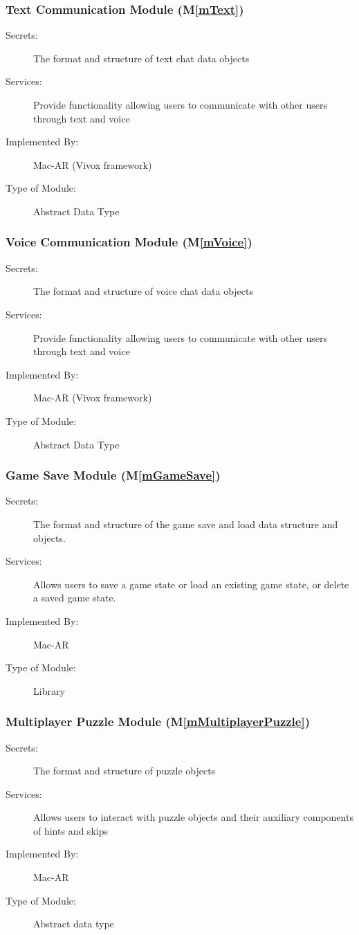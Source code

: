 \documentclass[12pt, titlepage]{article}
\newcommand{\mref}[1]{M\ref{#1}}
\begin{document}
\subsubsection{Text Communication Module (\mref{mText})}
\begin{description}
\item[Secrets:]The format and structure of text chat data objects
\item[Services:]Provide functionality allowing users to communicate with other users through text and voice
\item[Implemented By:] Mac-AR (Vivox framework)
\item[Type of Module:] Abstract Data Type
\end{description}

\subsubsection{Voice Communication Module (\mref{mVoice})}
\begin{description}
\item[Secrets:]The format and structure of voice chat data objects
\item[Services:]Provide functionality allowing users to communicate with other users through text and voice
\item[Implemented By:] Mac-AR (Vivox framework)
\item[Type of Module:] Abstract Data Type
\end{description}

\subsubsection{Game Save Module (\mref{mGameSave})}

\begin{description}
\item[Secrets:]The format and structure of the game save and load data structure and objects.
\item[Services:] Allows users to save a game state or load an existing game state, or delete a saved game state.
\item[Implemented By:] Mac-AR
\item[Type of Module:] Library
\end{description}



\subsubsection{Multiplayer Puzzle Module (\mref{mMultiplayerPuzzle})}
\begin{description}
\item[Secrets:]The format and structure of puzzle objects
\item[Services:]Allows users to interact with puzzle objects and their auxiliary components of hints and skips
\item[Implemented By:] Mac-AR
\item[Type of Module:] Abstract data type
\end{description}
\end{document}

